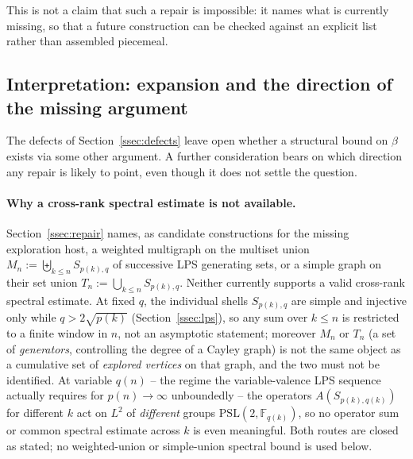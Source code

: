 \documentclass[11pt,a4paper]{article}
\theoremstyle{definition}
\theoremstyle{remark}
\begin{document}
    This is not a claim that such a repair is impossible: it names what is currently missing,
    so that a future construction can be checked against an explicit list rather than
    assembled piecemeal.

  \subsection{Interpretation: expansion and the direction of the missing argument}
    \label{ssec:tension}

    The defects of Section~\ref{ssec:defects} leave open whether a structural bound on
    $\beta$ exists via some other argument.
    A further consideration bears on which direction any repair is likely to point, even
    though it does not settle the question.

    \paragraph{Why a cross-rank spectral estimate is not available.}
    Section~\ref{ssec:repair} names, as candidate constructions for the missing exploration
    host, a weighted multigraph on the multiset union $M_n := \biguplus_{k\leq n} S_{p(k),q}$
    of successive LPS generating sets, or a simple graph on their set union $T_n :=
    \bigcup_{k\leq n} S_{p(k),q}$.
    Neither currently supports a valid cross-rank spectral estimate.
    At fixed $q$, the individual shells $S_{p(k),q}$ are simple and injective only while
    $q > 2\sqrt{p(k)}$ (Section~\ref{ssec:lps}), so any sum over $k\leq n$ is restricted to a
    finite window in $n$, not an asymptotic statement; moreover $M_n$ or $T_n$ (a set of
    \emph{generators}, controlling the degree of a Cayley graph) is not the same object as a
    cumulative set of \emph{explored vertices} on that graph, and the two must not be
    identified.
    At variable $q(n)$ -- the regime the variable-valence LPS sequence actually requires for
    $p(n)\to\infty$ unboundedly -- the operators $A(S_{p(k),q(k)})$ for different $k$ act on
    $L^2$ of
    \emph{different} groups $\mathrm{PSL}(2,\mathbb F_{q(k)})$, so no operator sum or common
    spectral estimate across $k$ is even meaningful.
    Both routes are closed as stated; no weighted-union or simple-union spectral bound is
    used below.
\end{document}
